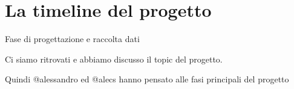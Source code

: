 \chapter{La timeline del progetto}

Fase di progettazione e raccolta dati

Ci siamo ritrovati e abbiamo discusso il topic del progetto.

Quindi @alessandro ed @alecs hanno pensato alle fasi principali del progetto 

